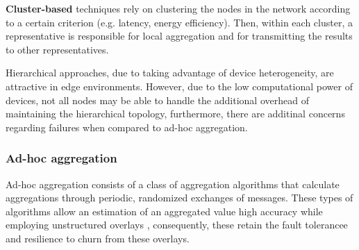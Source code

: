 
\textbf{Cluster-based} techniques rely on clustering the nodes in the network according to a certain criterion (e.g. latency, energy efficiency). Then, within each cluster, a representative is responsible for local aggregation and for transmitting the results to other representatives. 

Hierarchical approaches, due to taking advantage of device heterogeneity, are attractive in edge environments. However, due to the low computational power of devices, not all nodes may be able to handle the additional overhead of maintaining the hierarchical topology, furthermore, there are additinal concerns regarding failures when compared to ad-hoc aggregation.


\subsubsection*{Ad-hoc aggregation}

Ad-hoc aggregation consists of a class of aggregation algorithms that calculate aggregations through periodic, randomized exchanges of messages. These types of algorithms allow an estimation of an aggregated value high accuracy while employing unstructured overlays \cite{gossip_aggregation}, consequently, these retain the fault tolerancee and resilience to churn from these overlays.




